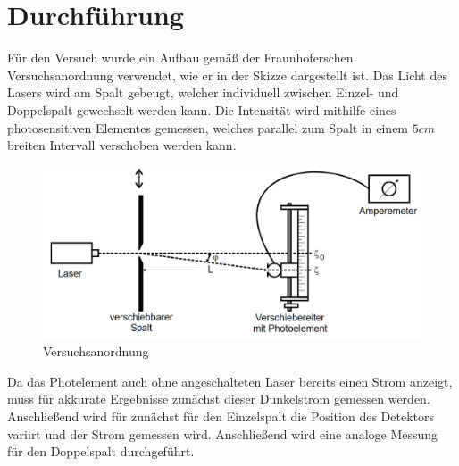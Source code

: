 \section{Durchführung}
Für den Versuch wurde ein Aufbau gemäß der Fraunhoferschen Versuchsanordnung verwendet, wie er in der Skizze dargestellt ist.
Das Licht des Lasers wird am Spalt gebeugt, welcher individuell zwischen Einzel- und Doppelspalt gewechselt werden kann.
Die Intensität wird mithilfe eines photosensitiven Elementes gemessen, welches parallel zum Spalt in einem $5cm$ breiten 
Intervall verschoben werden kann. \\
\begin{figure}[h]
    \centering
    \includegraphics[width=14cm, keepaspectratio]{Beugung am Spalt Versuchsanordnung}
    \caption{Versuchsanordnung}
  \end{figure}
Da das Photelement auch ohne angeschalteten Laser bereits einen Strom anzeigt, muss für akkurate Ergebnisse zunächst 
dieser Dunkelstrom gemessen werden. Anschließend wird für zunächst für den Einzelspalt die Position des Detektors variirt und
der Strom gemessen wird. Anschließend wird eine analoge Messung für den Doppelspalt durchgeführt.
